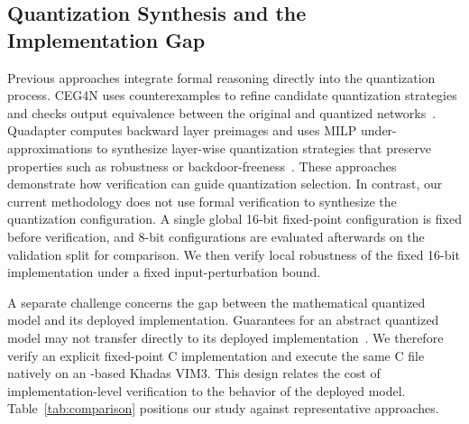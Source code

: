 \subsection{Quantization Synthesis and the Implementation Gap}
Previous approaches integrate formal reasoning directly into the quantization process. CEG4N uses counterexamples to refine candidate quantization strategies and checks output equivalence between the original and quantized networks~\cite{Matos2022CEG4N}. Quadapter computes backward layer preimages and uses MILP under-approximations to synthesize layer-wise quantization strategies that preserve properties such as robustness or backdoor-freeness~\cite{Zhang2024Quadapter}. These approaches demonstrate how verification can guide quantization selection. In contrast, our current methodology does not use formal verification to synthesize the quantization configuration. A single global 16-bit fixed-point configuration is fixed before verification, and 8-bit configurations are evaluated afterwards on the validation split for comparison. We then verify local robustness of the fixed 16-bit implementation under a fixed input-perturbation bound.



A separate challenge concerns the gap between the mathematical quantized model and its deployed implementation. Guarantees for an abstract quantized model may not transfer directly to its deployed implementation~\cite{Cordeiro2025NNPL}. We therefore verify an explicit fixed-point C implementation and execute the same C file natively on an \AAOS{}-based Khadas VIM3. This design relates the cost of implementation-level verification to the behavior of the deployed model. Table~\ref{tab:comparison} positions our study against representative approaches.

\begin{table}[h]
\centering
\caption{Positioning against representative approaches. 
}
\label{tab:comparison}
\scriptsize
{}%
\end{table}

